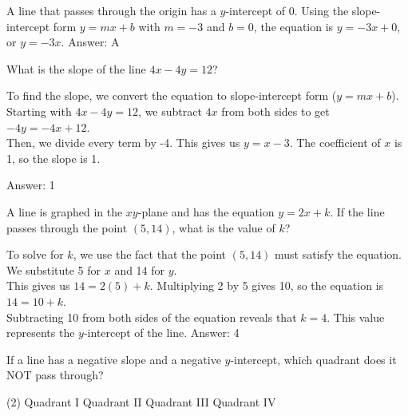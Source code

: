 \documentclass[11pt,paper=a4,answers]{exam}
\begin{document}
\begin{questions}
\begin{solution}
A line that passes through the origin has a $y$-intercept of 0. Using the slope-intercept form $y = mx + b$ with $m = -3$ and $b = 0$, the equation is $y = -3x + 0$, or $y = -3x$.
\vspace{15pt}
Answer: \colorbox{yellow!100}{A}
\end{solution}

\question
What is the slope of the line $4x - 4y = 12$?

\begin{solution}
To find the slope, we convert the equation to slope-intercept form ($y = mx + b$). Starting with $4x - 4y = 12$, we subtract $4x$ from both sides to get $-4y = -4x + 12$. 
\\[10pt]
Then, we divide every term by -4. This gives us $y = x - 3$. The coefficient of $x$ is 1, so the slope is 1.

\vspace{15pt}
Answer: \colorbox{yellow!100}{1}
\end{solution}


\question
A line is graphed in the $xy$-plane and has the equation $y = 2x + k$. If the line passes through the point $(5, 14)$, what is the value of $k$?

\begin{solution}
To solve for $k$, we use the fact that the point $(5, 14)$ must satisfy the equation. We substitute 5 for $x$ and 14 for $y$. 
\\[10pt]
This gives us $14 = 2(5) + k$. Multiplying 2 by 5 gives 10, so the equation is $14 = 10 + k$.
\\[10pt]
Subtracting 10 from both sides of the equation reveals that $k = 4$. This value represents the $y$-intercept of the line.
\vspace{15pt}
Answer: \colorbox{yellow!100}{4}
\end{solution}

\question
If a line has a negative slope and a negative $y$-intercept, which quadrant does it NOT pass through?
\begin{tasks}(2)
    \task Quadrant I
    \task Quadrant II
    \task Quadrant III
    \task Quadrant IV
\end{tasks}


\end{questions}
\end{document}
